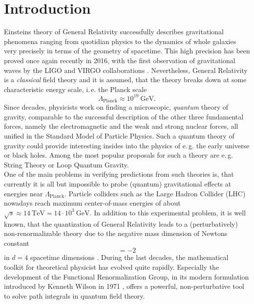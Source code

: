 \chapter{Introduction}
Einsteins theory of General Relativity successfully describes gravitational phenomena ranging from quotidian physics to the dynamics of whole galaxies very precisely in terms of the geometry of spacetime. This high precision has been proved once again recently in 2016, with the first observation of gravitational waves by the LIGO and VIRGO collaborations \cite{LIGO2016}. Nevertheless, General Relativity is a \textit{classical} field theory and it is assumed, that the theory breaks down at some characteristic energy scale, i.\,e. the Planck scale
\begin{equation*}
	\Lambda_{\text{Planck}} \approx 10^{19} \ \text{GeV}. 
\end{equation*}
Since decades, physicists work on finding a microscopic,  \textit{quantum} theory of gravity, comparable to the successful description of the other three fundamental forces, namely the electromagnetic and the weak and strong nuclear forces, all unified in the Standard Model of Particle Physics. Such a quantum theory of gravity could provide interesting insides into the physics of e.\,g. the early universe or black holes. Among the most popular proposals for such a theory are e.\,g. String Theory or Loop Quantum Gravity. \\
 One of the main problems in verifying predictions from such theories is, that currently it is all but impossible to probe (quantum) gravitational effects at energies near $\Lambda_{\text{Planck}}$. Particle colliders such as the Large Hadron Collider (LHC) nowadays reach maximum center-of-mass energies of about $\sqrt{s} \approx 14 \ \text{TeV} = 14\cdot 10^3 \ \text{GeV}$. In addition to this experimental problem, it is well known, that the quantization of General Relativity leads to a (perturbatively) non-renormalizable theory  due to the negative mass dimension of Newtons constant
\begin{equation*}
	[G] = -2  
\end{equation*}
in $d=4$ spacetime dimensions \cite{GoroffSanotti1985, tHooftVeltmann1974}. During the last decades, the mathematical toolkit for theoretical physicist has evolved quite rapidly. Especially the development of the Functional Renormalization Group, in its modern formulation introduced by Kenneth Wilson in 1971 \cite{Wilson1971}, offers a powerful, non-perturbative tool to solve path integrals in quantum field theory. \\
